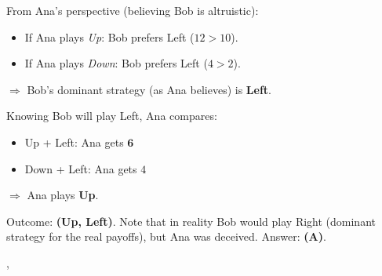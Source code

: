 {{    From Ana's perspective (believing Bob is altruistic):
    \begin{itemize}
      \item If Ana plays \textit{Up}: Bob prefers Left ($12 > 10$).
      \item If Ana plays \textit{Down}: Bob prefers Left ($4 > 2$).
    \end{itemize}
    $\Rightarrow$ Bob's dominant strategy (as Ana believes) is \textbf{Left}.

    Knowing Bob will play Left, Ana compares:
    \begin{itemize}
      \item Up + Left: Ana gets $\mathbf{6}$
      \item Down + Left: Ana gets $4$
    \end{itemize}
    $\Rightarrow$ Ana plays \textbf{Up}.

    Outcome: \textbf{(Up, Left)}. Note that in reality Bob would play Right
    (dominant strategy for the real payoffs), but Ana was deceived.
    Answer: \textbf{(A)}.
  },
}
